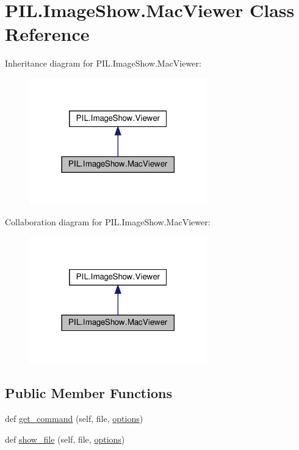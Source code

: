 \hypertarget{classPIL_1_1ImageShow_1_1MacViewer}{}\section{P\+I\+L.\+Image\+Show.\+Mac\+Viewer Class Reference}
\label{classPIL_1_1ImageShow_1_1MacViewer}


Inheritance diagram for P\+I\+L.\+Image\+Show.\+Mac\+Viewer\+:
\nopagebreak
\begin{figure}[H]
\begin{center}
\leavevmode
\includegraphics[width=218pt]{classPIL_1_1ImageShow_1_1MacViewer__inherit__graph}
\end{center}
\end{figure}


Collaboration diagram for P\+I\+L.\+Image\+Show.\+Mac\+Viewer\+:
\nopagebreak
\begin{figure}[H]
\begin{center}
\leavevmode
\includegraphics[width=218pt]{classPIL_1_1ImageShow_1_1MacViewer__coll__graph}
\end{center}
\end{figure}
\subsection*{Public Member Functions}
\begin{DoxyCompactItemize}
\item 
def \hyperlink{classPIL_1_1ImageShow_1_1MacViewer_a58f2bb39c85dbd21198de8963d8de0d1}{get\+\_\+command} (self, file, \hyperlink{classPIL_1_1ImageShow_1_1MacViewer_ab5bc10ef38304f9a19b548923a76485c}{options})
\item 
def \hyperlink{classPIL_1_1ImageShow_1_1MacViewer_afd74dc5d4a32b4743de66709af04ccdd}{show\+\_\+file} (self, file, \hyperlink{classPIL_1_1ImageShow_1_1MacViewer_ab5bc10ef38304f9a19b548923a76485c}{options})
\end{DoxyCompactItemize}
